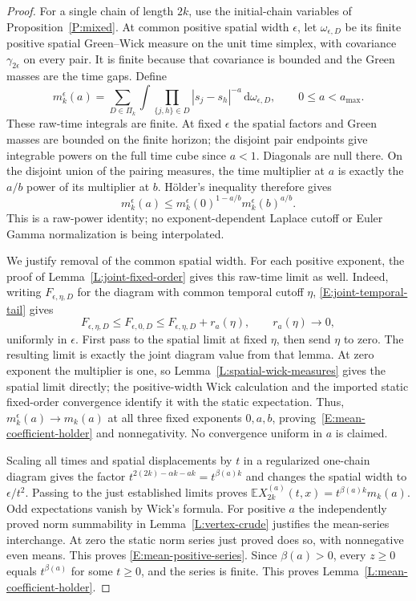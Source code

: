 \documentclass[12pt]{article}
\numberwithin{equation}{section}
\theoremstyle{definition}
\newcommand{\E}{\mathbb{E}}
\newcommand{\ud}{\,\mathrm{d}}
\begin{document}
\begin{proof}
  For a single chain of length $2k$, use the initial-chain variables of
  Proposition~\ref{P:mixed}. At common positive spatial width $\epsilon$,
  let $\omega_{\epsilon,D}$ be its finite positive spatial Green--Wick
  measure on the unit time simplex, with covariance $\gamma_{2\epsilon}$
  on every pair. It is finite because that covariance is bounded and
  the Green masses are the time gaps. Define
  \[
    m_k^\epsilon(a)=\sum_{D\in\Pi_k}\int
    \prod_{\{j,h\}\in D}|s_j-s_h|^{-a}\ud\omega_{\epsilon,D},
    \qquad 0\le a<a_{\max}.
  \]
  These raw-time integrals are finite. At fixed $\epsilon$ the spatial
  factors and Green masses are bounded on the finite horizon; the
  disjoint pair endpoints give integrable powers on the full time cube
  since $a<1$. Diagonals are null there. On the disjoint union of the
  pairing measures, the time multiplier at $a$ is exactly the $a/b$ power
  of its multiplier at $b$. H\"older's inequality therefore gives
  \[
    m_k^\epsilon(a)\le
    m_k^\epsilon(0)^{1-a/b}m_k^\epsilon(b)^{a/b}.
  \]
  This is a raw-power identity; no exponent-dependent Laplace cutoff or
  Euler Gamma normalization is being interpolated.

  We justify removal of the common spatial width. For each positive
  exponent, the proof of Lemma~\ref{L:joint-fixed-order} gives this
  raw-time limit as well. Indeed, writing $F_{\epsilon,\eta,D}$ for
  the diagram with common temporal cutoff $\eta$,
  \eqref{E:joint-temporal-tail} gives
  \[
    F_{\epsilon,\eta,D}\le F_{\epsilon,0,D}
    \le F_{\epsilon,\eta,D}+r_a(\eta),\qquad r_a(\eta)\longrightarrow0,
  \]
  uniformly in $\epsilon$. First pass to the spatial limit at fixed
  $\eta$, then send $\eta$ to zero. The resulting limit is exactly
  the joint diagram value from that lemma. At zero exponent the
  multiplier is one, so Lemma~\ref{L:spatial-wick-measures} gives the
  spatial limit directly; the positive-width Wick calculation and
  the imported static fixed-order convergence identify it with the
  static expectation. Thus, $m_k^\epsilon(a)\to m_k(a)$ at all three
  fixed exponents $0,a,b$, proving~\eqref{E:mean-coefficient-holder}
  and nonnegativity. No convergence uniform in $a$ is claimed.

  Scaling all times and spatial displacements by $t$ in a regularized
  one-chain diagram gives the factor
  $t^{2(2k)-\alpha k-ak}=t^{\beta(a)k}$ and changes the spatial width
  to $\epsilon/t^2$. Passing to the just established limits proves
  $\E X_{2k}^{(a)}(t,x)=t^{\beta(a)k}m_k(a)$.
  Odd expectations vanish by Wick's formula. For positive $a$ the
  independently proved norm summability in Lemma~\ref{L:vertex-crude}
  justifies the mean-series interchange. At zero the static norm series
  just proved does so, with nonnegative even means. This proves
  \eqref{E:mean-positive-series}. Since $\beta(a)>0$, every $z\ge0$
  equals $t^{\beta(a)}$ for some $t\ge0$, and the series is finite.
  This proves Lemma~\ref{L:mean-coefficient-holder}.
\end{proof}
\end{document}
